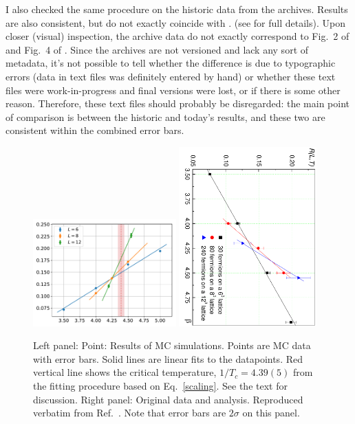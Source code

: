 I also checked the same procedure on the historic data from the archives.
Results are also consistent, but do not exactly coincide with \cite{NJP:2006}.
(see \cite{GH:2020} for full details). 
Upon closer (visual) inspection, the archive data do not exactly correspond to 
Fig.\ 2 of \cite{PRL:2006} and Fig.\ 4 of \cite{NJP:2006}. Since the archives
are not versioned and lack any sort of metadata, it's not possible to tell
whether the difference is due to typographic errors (data in text files was
definitely entered by hand) or whether these text files were work-in-progress
and final versions were lost, or if there is some other reason. Therefore,
these text files should probably be disregarded: the main point of comparison
is between the historic and today's results, and these two are consistent within
the combined error bars.

\begin{figure}
\includegraphics[width=0.49\textwidth, keepaspectratio=True]{crossing_2.pdf}
\includegraphics[width=0.47\textwidth, keepaspectratio=True]{crossing.pdf}
%
\caption{Left panel: Point: Results of MC simulations. Points are MC data with
error bars. Solid lines are linear fits to the datapoints. Red vertical line
shows the critical temperature, $1/T_c = 4.39(5)$ from the fitting procedure based
on Eq.\ \eqref{scaling}. See the text for discussion.
 Right panel: Original data and analysis. Reproduced
verbatim from Ref.\ \cite{PRL:2006}. Note that error bars are $2\sigma$ on this
panel.
\label{fig:crossing}
}
\end{figure}




